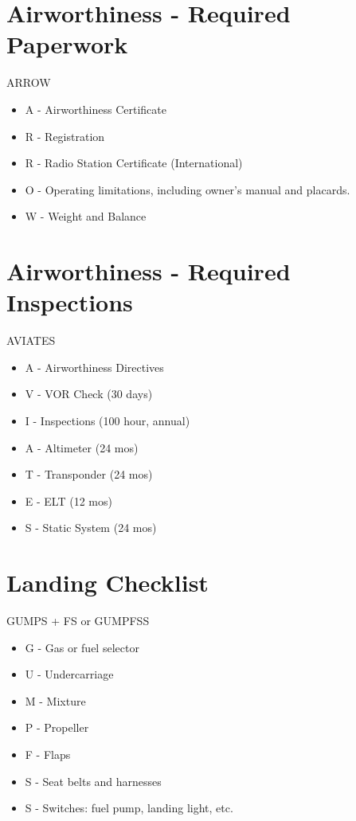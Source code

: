 \section{Airworthiness - Required Paperwork}

ARROW

\begin{itemize}
\item A - Airworthiness Certificate
\item R - Registration
\item R - Radio Station Certificate (International)
\item O - Operating limitations, including owner's manual and placards.
\item W - Weight and Balance
\end{itemize}

\section{Airworthiness - Required Inspections}

AVIATES

\begin{itemize}
\item A - Airworthiness Directives
\item V - VOR Check (30 days)
\item I - Inspections (100 hour, annual)
\item A - Altimeter (24 mos)
\item T - Transponder (24 mos)
\item E - ELT (12 mos)
\item S - Static System (24 mos)
\end{itemize}

\section{Landing Checklist}

GUMPS + FS or GUMPFSS

\begin{itemize}
\item G - Gas or fuel selector
\item U - Undercarriage
\item M - Mixture
\item P - Propeller
\item F - Flaps
\item S - Seat belts and harnesses
\item S - Switches: fuel pump, landing light, etc.
\end{itemize}

